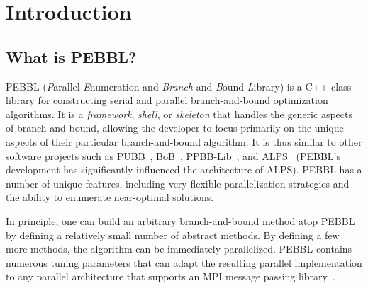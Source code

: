 \section{Introduction}


\subsection{What is PEBBL?}

PEBBL (\emph{P}arallel \emph{E}numeration and
\emph{Branch}-and-\emph{B}ound \emph{L}ibrary) is a C++ class library
for constructing serial and parallel branch-and-bound optimization
algorithms.  It is a \emph{framework}, \emph{shell}, or
\emph{skeleton} that handles the generic aspects of branch and bound,
allowing the developer to focus primarily on the unique aspects of
their particular branch-and-bound algorithm.  
It is thus similar to other software projects such
as PUBB~\cite{SHH95,SHH97}, BoB~\cite{bob95}, PPBB-Lib~\cite{PPBB96},
and ALPS~\cite{RLS04} (PEBBL's development has significantly
influenced the architecture of ALPS).  PEBBL has a number of unique
features, including very flexible parallelization strategies and the
ability to enumerate near-optimal solutions.

In principle, one can build an arbitrary branch-and-bound method atop
PEBBL by defining a relatively small number of abstract methods.  By
defining a few more methods, the algorithm can be immediately
parallelized.  PEBBL contains numerous tuning parameters that can
adapt the resulting parallel implementation to any parallel
architecture that supports an MPI message passing
library~\cite{SOHWD96}.



